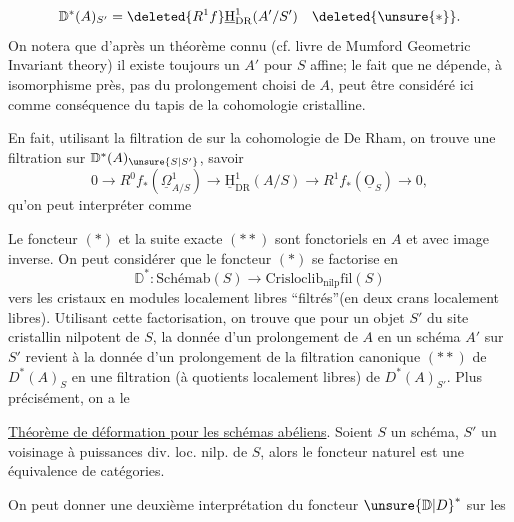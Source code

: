 \[
\mathbb D^*(A)_{S'}=\deleted{R^1f}\underline{\mathrm H}^1_{\mathrm{DR}}(A'/S')\quad\deleted{\unsure{*}}.
\]
On notera que d'après un théorème connu (cf. livre de Mumford Geometric Invariant theory) il existe toujours un $A'$ pour $S$ affine; le fait que  ne dépende, à isomorphisme près, pas du prolongement choisi de $A$, peut être considéré ici comme conséquence du tapis de la cohomologie cristalline.

En fait, utilisant la filtration de  sur la cohomologie de De Rham, on trouve une filtration sur $\mathbb D^*(A)_{\unsure{S|S'}}$, savoir
\[
0\longrightarrow R^0f_*(\underline\Omega^1_{A/S})\longrightarrow
\underline{\mathrm H}^1_{\mathrm{DR}}(A/S)\longrightarrow R^1f_*(\underline{\mathrm O}_S)\longrightarrow0,
\]
qu'on peut interpréter comme

Le foncteur $(*)$ et la suite exacte $(**)$ sont fonctoriels en $A$ et  avec image inverse. On peut  considérer que le foncteur $(*)$ se factorise en
\[
\mathbb D^*:\text{Schémab}(S)\longrightarrow\mathrm{Crisloclib}_{\mathrm{nilp}}\mathrm{fil}(S)
\]
vers les cristaux en modules localement libres ``filtrés''(en deux crans localement libres). Utilisant cette factorisation, on trouve que pour un objet $S'$ du site cristallin nilpotent de $S$, la donnée d'un prolongement de $A$ en un schéma  $A'$ sur $S'$ revient à la donnée d'un prolongement de la filtration canonique $(**)$ de $D^*(A)_S$ en une filtration (à quotients localement libres) de $D^*(A)_{S'}$. Plus précisément, on a le

\uline{Théorème de déformation pour les schémas abéliens}. Soient $S$ un schéma, $S'$ un voisinage à puissances div. loc. nilp. de $S$, alors le foncteur naturel
est une équivalence de catégories.

 On peut donner une deuxième interprétation du foncteur $\unsure{\mathbb D|D}^*$ sur les
